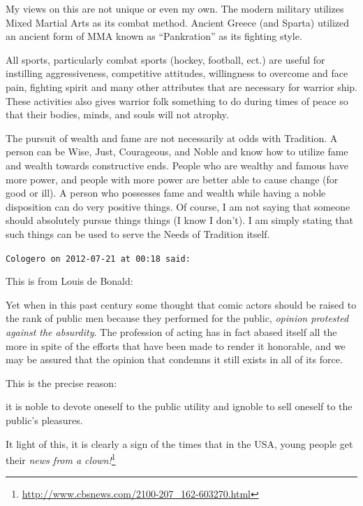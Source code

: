 \begin{footnotesize}
\begin{sffamily}
My views on this are not unique or even my own. The modern military utilizes Mixed Martial Arts as its combat method. Ancient Greece (and Sparta) utilized an ancient form of MMA known as ``Pankration'' as its fighting style.

All sports, particularly combat sports (hockey, football, ect.) are useful for instilling aggressiveness, competitive attitudes, willingness to overcome and face pain, fighting spirit and many other attributes that are necessary for warrior ship. These activities also gives warrior folk something to do during times of peace so that their bodies, minds, and souls will not atrophy.

The pursuit of wealth and fame are not necessarily at odds with Tradition. A person can be Wise, Just, Courageous, and Noble and know how to utilize fame and wealth towards constructive ends. People who are wealthy and famous have more power, and people with more power are better able to cause change (for good or ill). A person who possesses fame and wealth while having a noble disposition can do very positive things. Of course, I am not saying that someone should absolutely pursue things things (I know I don't). I am simply stating that such things can be used to serve the Needs of Tradition itself.

\hfill

\texttt{Cologero on 2012-07-21 at 00:18 said:}

This is from Louis de Bonald:

\begin{quotex}\footnotesize

Yet when in this past century some thought that comic actors should be raised to the rank of public men because they performed for the public, \emph{opinion protested against the absurdity}. The profession of acting has in fact abased itself all the more in spite of the efforts that have been made to render it honorable, and we may be assured that the opinion that condemns it still exists in all of its force.
\end{quotex}


This is the precise reason:

\begin{quotex}\footnotesize

it is noble to devote oneself to the public utility and ignoble to sell oneself to the public's pleasures.
\end{quotex}


It light of this, it is clearly a sign of the times that in the USA, young people get their \textit{news from a clown!}\footnote{\url{http://www.cbsnews.com/2100-207\_162-603270.html}}


\end{sffamily}
\end{footnotesize}
